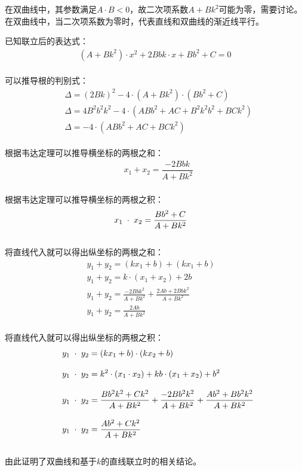 \documentclass[UTF8]{ctexart}
\begin{document}
    在双曲线中，其参数满足$A\cdot B<0$，故二次项系数$A+Bk^2$可能为零，需要讨论。\\[3mm]
    在双曲线中，当二次项系数为零时，代表直线和双曲线的渐近线平行。
    
\newpage

    已知联立后的表达式：
    \begin{align}
        \left(A+Bk^2\right)\cdot x^2+2Bbk\cdot x+Bb^2+C=0
    \end{align}\\
    可以推导根的判别式：
    \begin{align}
        &\Delta=(2Bk)^2-4\cdot\left(A+Bk^2\right)\cdot\left(Bb^2+C\right)\\[3mm]
        &\Delta=4B^2b^2k^2-4\cdot\left(ABb^2+AC+B^2k^2b^2+BCk^2\right)\\[3mm]
        &\Delta=-4\cdot\left(ABb^2+AC+BCk^2\right)
    \end{align}\\
    根据韦达定理可以推导横坐标的两根之和：
    \begin{align}
        &x_1+x_2=\dfrac{-2Bbk}{A+Bk^2}
    \end{align}\\
    根据韦达定理可以推导横坐标的两根之积：
    \begin{align}
        &x_1\hspace{3.0pt}\cdot\hspace{3.0pt}x_2=\dfrac{Bb^2+C}{A+Bk^2}
    \end{align}\\    
    将直线代入就可以得出纵坐标的两根之和：\vspace{3pt}
    \begin{align}
        &y_1+y_2=(kx_1+b)+(kx_1+b)\\[3mm]
        &y_1+y_2=k\cdot(x_1+x_2)+2b\\[3mm]
        &y_1+y_2=\frac{-2Bbk^2}{A+Bk^2}+\frac{2Ab+2Bbk^2}{A+Bk^2}~~~~~~~~~~~~~~~~~~~~~~\\[3mm]
        &y_1+y_2=\frac{2Ab}{A+Bk^2}
    \end{align}\\
    将直线代入就可以得出纵坐标的两根之积：\vspace{3pt}
    \begin{align}
        &~~y_1\hspace{3.0pt}\cdot\hspace{3.0pt}y_2=(kx_1+b)\cdot(kx_2+b)\\[3mm]
        &~~y_1\hspace{3.0pt}\cdot\hspace{3.0pt}y_2=k^2\cdot(x_1\cdot x_2)+kb\cdot(x_1+x_2)+b^2\\[3mm]
        &~~y_1\hspace{3.0pt}\cdot\hspace{3.0pt}y_2=\frac{Bb^2k^2+Ck^2}{A+Bk^2}+\frac{-2Bb^2k^2}{A+Bk^2}+\frac{Ab^2+Bb^2k^2}{A+Bk^2}\\[3mm]
        &~~y_1\hspace{3.0pt}\cdot\hspace{3.0pt}y_2=\frac{Ab^2+Ck^2}{A+Bk^2}
    \end{align}\\
    由此证明了双曲线和基于$k$的直线联立时的相关结论。
\end{document}
